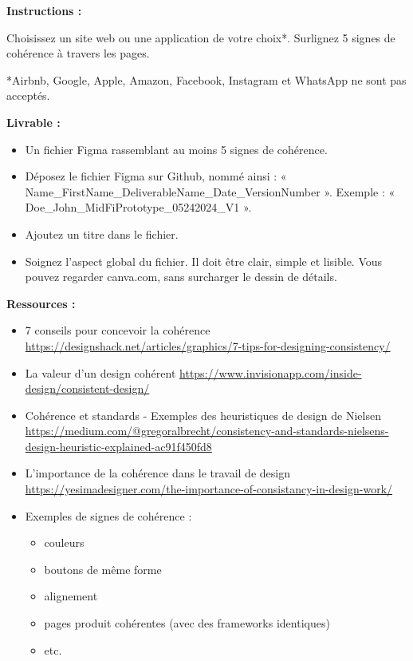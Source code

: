 \makeheaderfiles

\textbf{Instructions :}

Choisissez un site web ou une application de votre choix*. Surlignez 5 signes de cohérence à travers les pages.

*Airbnb, Google, Apple, Amazon, Facebook, Instagram et WhatsApp ne sont pas acceptés.

\textbf{Livrable :}

\begin{itemize}
\item Un fichier Figma rassemblant au moins 5 signes de cohérence.
\item Déposez le fichier Figma sur Github, nommé ainsi : « Name\_FirstName\_DeliverableName\_Date\_VersionNumber ». Exemple : « Doe\_John\_MidFiPrototype\_05242024\_V1 ».
\item Ajoutez un titre dans le fichier.
\item Soignez l'aspect global du fichier. Il doit être clair, simple et lisible. Vous pouvez regarder canva.com, sans surcharger le dessin de détails.
\end{itemize}

\textbf{Ressources :}

\begin{itemize}
\item 7 conseils pour concevoir la cohérence \url{https://designshack.net/articles/graphics/7-tips-for-designing-consistency/}
\item La valeur d'un design cohérent \url{https://www.invisionapp.com/inside-design/consistent-design/}
\item Cohérence et standards - Exemples des heuristiques de design de Nielsen \url{https://medium.com/@gregoralbrecht/consistency-and-standards-nielsens-design-heuristic-explained-ac91f450fd8}
\item L'importance de la cohérence dans le travail de design \url{https://yesimadesigner.com/the-importance-of-consistancy-in-design-work/}
\item Exemples de signes de cohérence :
\begin{itemize}
\item couleurs
\item boutons de même forme
\item alignement
\item pages produit cohérentes (avec des frameworks identiques)
\item etc.
\end{itemize}
\end{itemize}

